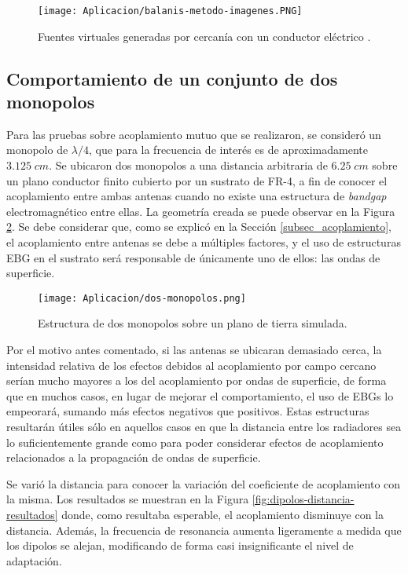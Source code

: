 \begin{figure}[H]
	\centering
	\texttt{[image: Aplicacion/balanis-metodo-imagenes.PNG]}
	\caption{Fuentes virtuales generadas por cercanía con un conductor eléctrico \cite{Balanis:Theory}.}
	\label{fig:fuentes-virtuales}
\end{figure}

\subsection{Comportamiento de un conjunto de dos monopolos}

Para las pruebas sobre acoplamiento mutuo que se realizaron, se consideró un monopolo de $\lambda/4$, que para la frecuencia de interés es de aproximadamente $3.125\;cm$. Se ubicaron dos monopolos a una distancia arbitraria de $6.25\; cm$ sobre un plano conductor finito cubierto por un sustrato de FR-4, a fin de conocer el acoplamiento entre ambas antenas cuando no existe una estructura de \textit{bandgap} electromagnético entre ellas. La geometría creada se puede observar en la Figura \ref{fig:dos-monopolos}. Se debe considerar que, como se explicó en la Sección \ref{subsec_acoplamiento}, el acoplamiento entre antenas se debe a múltiples factores, y el uso de estructuras EBG en el sustrato será responsable de únicamente uno de ellos: las ondas de superficie.

\begin{figure}[H]
	\centering
	\texttt{[image: Aplicacion/dos-monopolos.png]}
	\caption{Estructura de dos monopolos sobre un plano de tierra simulada.}
	\label{fig:dos-monopolos}
\end{figure}

Por el motivo antes comentado, si las antenas se ubicaran demasiado cerca, la intensidad relativa de los efectos debidos al acoplamiento por campo cercano serían mucho mayores a los del acoplamiento por ondas de superficie, de forma que en muchos casos, en lugar de mejorar el comportamiento, el uso de EBGs lo empeorará, sumando más efectos negativos que positivos. Estas estructuras resultarán útiles sólo en aquellos casos en que la distancia entre los radiadores sea lo suficientemente grande como para poder considerar efectos de acoplamiento relacionados a la propagación de ondas de superficie.

Se varió la distancia para conocer la variación del coeficiente de acoplamiento con la misma. Los resultados se muestran en la Figura \ref{fig:dipolos-distancia-resultados} donde, como resultaba esperable, el acoplamiento disminuye con la distancia. Además, la frecuencia de resonancia aumenta ligeramente a medida que los dipolos se alejan, modificando de forma casi insignificante el nivel de adaptación.

